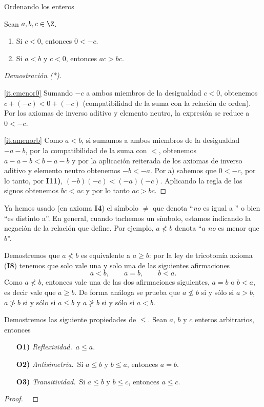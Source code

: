 \begin{section}{Ordenando los enteros}
\begin{proposicion}\label{prop-compatibilidad-negativa}
    Sean $a, b, c \in \Z$.  
    \begin{enumerate}[label=\textit{\alph*)}]
        \item\label{it.cmenor0} Si $c < 0$, entonces $0 < -c$.
        \item\label{it.amenorb} Si $a< b$ y $c< 0$, entonces $ac > bc$. 
    \end{enumerate}
\end{proposicion}
\begin{proof}[Demostración (*)] {${}^{}$}
    
    \ref{it.cmenor0} Sumando $-c$ a ambos miembros de la desigualdad $c < 0$, obtenemos $c + (-c) < 0 + (-c)$ (compatibilidad de la suma con la relación de orden). Por los axiomas de inverso aditivo y elemento neutro, la expresión se reduce a $0 < -c$.
    
    \ref{it.amenorb} Como $a < b$, si sumamos a ambos miembros de la desigualdad $-a -b$, por la compatibilidad  de la suma con $<$, obtenemos $a -a -b < b -a -b$ y por la aplicación reiterada de los axiomas de inverso aditivo y elemento neutro  obtenemos $-b < -a$. Por a) sabemos que $0< -c$, por lo tanto, por \textbf{I11)}, $(-b)(-c) < (-a)(-c)$. Aplicando la regla de los signos obtenemos $bc < ac$ y por lo tanto $ac > bc$.

\end{proof}

Ya hemos usado (en axioma \textbf{I4}) el símbolo $\not=$ que denota  ``{\em no} es igual a '' o bien ``es distinto a''.   En  general, cuando tachemos un símbolo, estamos indicando la negación de la relación que define. Por ejemplo, $a\not< b$ denota ``$a$ {\em no} es menor que $b$''. 

\begin{observacion*} Demostremos que  $a\not< b$ es equivalente a $a\ge b$: por la ley de tricotomía axioma (\textbf{I8}) tenemos que solo vale una y solo una de las siguientes afirmaciones
$$
a<b, \qquad a = b, \qquad b < a.
$$
Como  $a\not< b$, entonces vale una de las dos afirmaciones siguientes, $a=b$ o $b<a$, es decir  vale que $a \ge b$. De forma análoga se prueba que $a\not\le b$ si  y sólo si $a>b$, $a\not> b$ si  y sólo si $a \le b$ y $a\not\ge b$ si  y sólo si $a<b$.

\end{observacion*}


\begin{ejemplo}\label{relaciondeorden}
Demostremos las siguiente propiedades de $\le$. Sean  $a$, $b$ y $c$  enteros arbitrarios,  entonces
\begin{enumerate}
\item[\textbf{O1)}] {\em Reflexividad.}\, $a \le a$.
\item[\textbf{O2)}] {\em Antisimetría.}\, Si $a \le b$ y $b \le a$, entonces $a=b$.
\item[\textbf{O3)}] {\em Transitividad.}\, Si $a\le b$ y $b\le c$, entonces $a \le c$.
\end{enumerate}
\begin{proof}
\
    

\end{proof}
\end{ejemplo}
\end{section}
